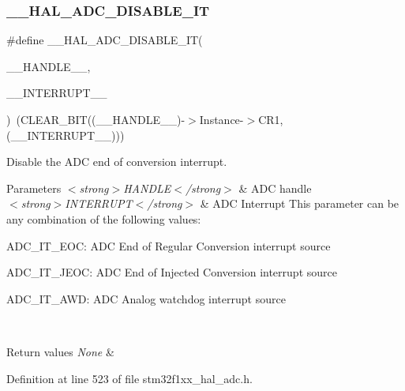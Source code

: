 \subsubsection{\texorpdfstring{\+\_\+\+\_\+\+H\+A\+L\+\_\+\+A\+D\+C\+\_\+\+D\+I\+S\+A\+B\+L\+E\+\_\+\+IT}{\_\_HAL\_ADC\_DISABLE\_IT}}
{\footnotesize\ttfamily \#define \+\_\+\+\_\+\+H\+A\+L\+\_\+\+A\+D\+C\+\_\+\+D\+I\+S\+A\+B\+L\+E\+\_\+\+IT(\begin{DoxyParamCaption}\item[{}]{\+\_\+\+\_\+\+H\+A\+N\+D\+L\+E\+\_\+\+\_\+,  }\item[{}]{\+\_\+\+\_\+\+I\+N\+T\+E\+R\+R\+U\+P\+T\+\_\+\+\_\+ }\end{DoxyParamCaption})~(C\+L\+E\+A\+R\+\_\+\+B\+IT((\+\_\+\+\_\+\+H\+A\+N\+D\+L\+E\+\_\+\+\_\+)-\/$>$Instance-\/$>$C\+R1, (\+\_\+\+\_\+\+I\+N\+T\+E\+R\+R\+U\+P\+T\+\_\+\+\_\+)))}



Disable the A\+DC end of conversion interrupt. 


\begin{DoxyParams}{Parameters}
{\em $<$strong$>$\+H\+A\+N\+D\+L\+E$<$/strong$>$} & A\+DC handle \\
\hline
{\em $<$strong$>$\+I\+N\+T\+E\+R\+R\+U\+P\+T$<$/strong$>$} & A\+DC Interrupt This parameter can be any combination of the following values\+: \begin{DoxyItemize}
\item A\+D\+C\+\_\+\+I\+T\+\_\+\+E\+OC\+: A\+DC End of Regular Conversion interrupt source \item A\+D\+C\+\_\+\+I\+T\+\_\+\+J\+E\+OC\+: A\+DC End of Injected Conversion interrupt source \item A\+D\+C\+\_\+\+I\+T\+\_\+\+A\+WD\+: A\+DC Analog watchdog interrupt source \end{DoxyItemize}
\\
\hline
\end{DoxyParams}

\begin{DoxyRetVals}{Return values}
{\em None} & \\
\hline
\end{DoxyRetVals}


Definition at line 523 of file stm32f1xx\+\_\+hal\+\_\+adc.\+h.

\mbox{\label{group___a_d_c___exported___macros_gaadf16862da7593def189559423c287f4}} 
